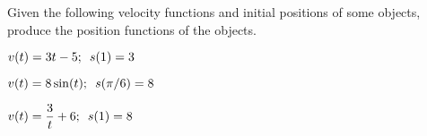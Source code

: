 \begin{activity} \label{A:4.5.2}  Given the following velocity functions and initial positions of some objects, produce the position functions of the objects.
\ba
\item $\displaystyle v(t) = 3t - 5; \enskip s(1) = 3$
\item $\displaystyle v(t) = 8 \sin(t); \enskip s(\pi/6) = 8$
\item $\displaystyle v(t) = \frac{3}{t} + 6; \enskip s(1) = 8$
\ea
\end{activity}
